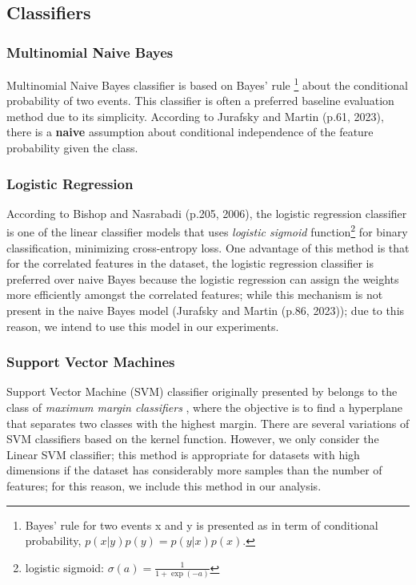 \documentclass[11pt]{article}
\begin{document}
\subsection{Classifiers}
\subsubsection{Multinomial Naive Bayes}
Multinomial Naive Bayes classifier is based on Bayes' rule \cite{bayes}\footnote{Bayes' rule for two events x and y is presented as in term of conditional probability, $p(x|y)p(y)=p(y|x)p(x)$.} about the conditional probability of two events. This classifier is often a preferred  baseline evaluation method due to its simplicity. According to Jurafsky and Martin (p.61, 2023), there is a \textbf{naive} assumption about conditional independence of the feature probability given the class.

\subsubsection{Logistic Regression}
According to Bishop and Nasrabadi (p.205, 2006), the logistic regression classifier is one of the linear classifier models that uses \textit{logistic sigmoid} function\footnote{logistic sigmoid: $\sigma(a)=\frac{1}{1+\exp{(-a)}}$} for binary classification, minimizing cross-entropy loss. One advantage of this method is that for the correlated features in the dataset, the logistic regression classifier is preferred over naive Bayes because the logistic regression can assign the weights more efficiently amongst the correlated features; while this mechanism is not present in the naive Bayes model (Jurafsky and Martin (p.86, 2023)); due to this reason, we intend to use this model in our experiments.

\subsubsection{Support Vector Machines}
Support Vector Machine (SVM) classifier originally presented by \cite{vapnik} belongs to the class of \textit{maximum margin classifiers} \cite{bishop}, where the objective is to find a hyperplane that separates two classes with the highest margin. There are several variations of SVM classifiers based on the kernel function. However, we only consider the Linear SVM classifier; this method is appropriate for datasets with high dimensions if the dataset has considerably more samples than the number of features; for this reason, we include this method in our analysis.
\end{document}
